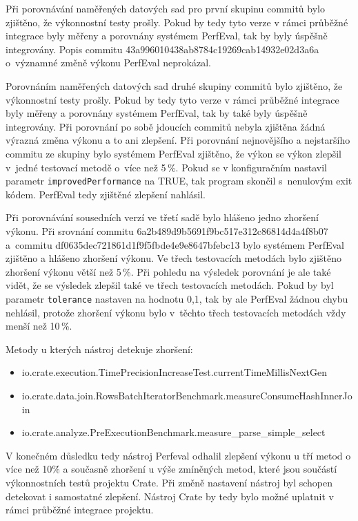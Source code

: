 Při porovnávání naměřených datových sad pro první skupinu commitů bylo zjištěno, že výkonnostní testy prošly.
Pokud by tedy tyto verze v rámci průběžné integrace byly měřeny a porovnány systémem PerfEval, tak by byly úspěšně integrovány.
Popis commitu 43a996010438ab8784c19269cab14932e02d3a6a o~významné změně výkonu PerfEval neprokázal.

Porovnáním naměřených datových sad druhé skupiny commitů bylo zjištěno, že výkonnostní testy prošly.
Pokud by tedy tyto verze v rámci průběžné integrace byly měřeny a porovnány systémem PerfEval, tak by také byly úspěšně integrovány.
Při porovnání po sobě jdoucích commitů nebyla zjištěna žádná výrazná změna výkonu a to ani zlepšení.
Při porovnání nejnovějšího a nejstaršího commitu ze skupiny bylo systémem PerfEval zjištěno, že výkon se výkon zlepšil
v~jedné testovací metodě o~více než 5\,\%.
Pokud se v konfiguračním nastavil parametr \lstinline{improvedPerformance} na TRUE, tak program skončil s~nenulovým exit kódem.
PerfEval tedy zjištěné zlepšení nahlásil.

Při porovnávání sousedních verzí ve třetí sadě bylo hlášeno jedno zhoršení výkonu.
Při srovnání commitu 6a2b489d9b5691f9bc517e312c86814d4a4f8b07 a~commitu df0635dec721861d1f9f5fbde4e9e8647bfebc13
bylo systémem PerfEval zjištěno a hlášeno zhoršení výkonu. Ve třech testovacích metodách bylo zjištěno zhoršení výkonu
větší než 5\,\%. Při pohledu na výsledek porovnání je ale také vidět, že se výsledek zlepšil také ve třech testovacích metodách.
Pokud by byl parametr \lstinline{tolerance} nastaven na hodnotu 0,1, tak by ale PerfEval žádnou chybu nehlásil, protože
zhoršení výkonu bylo v~těchto třech testovacích metodách vždy menší než 10\,\%.

Metody u kterých nástroj detekuje zhoršení:
\begin{itemize}
    \item io.crate.execution.TimePrecisionIncreaseTest.currentTimeMillisNextGen
    \item io.crate.data.join.\-RowsBatchIteratorBenchmark.measureConsumeHash\linebreak InnerJoin
    \item io.crate.analyze.PreExecutionBenchmark.measure\_parse\_simple\_select
\end{itemize}

V konečném důsledku tedy nástroj Perfeval odhalil zlepšení výkonu u tří metod o více než 10\.\% a současně zhoršení u výše zmíněných metod, které jsou
součástí výkonnostních testů projektu Crate. Při změně nastavení nástroj byl schopen detekovat i samostatné zlepšení.
Nástroj Crate by tedy bylo možné uplatnit v rámci průběžné integrace projektu.

